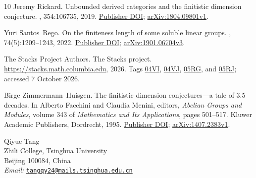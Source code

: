 \documentclass[11pt]{article}
\numberwithin{equation}{section}
\theoremstyle{definition}
\theoremstyle{remark}
\begin{document}
\begin{thebibliography}{10}
Jeremy Rickard.
\newblock Unbounded derived categories and the finitistic dimension conjecture.
, 354:106735, 2019.
\newblock \href{https://doi.org/10.1016/j.aim.2019.106735}{Publisher DOI};
  \href{https://arxiv.org/abs/1804.09801v1}{arXiv:1804.09801v1}.

Yuri Santos~Rego.
\newblock On the finiteness length of some soluble linear groups.
, 74(5):1209--1243, 2022.
\newblock \href{https://doi.org/10.4153/S0008414X21000213}{Publisher DOI};
  \href{https://arxiv.org/abs/1901.06704v3}{arXiv:1901.06704v3}.

{The Stacks Project Authors}.
\newblock The {Stacks} project.
\newblock \url{https://stacks.math.columbia.edu}, 2026.
\newblock Tags \href{https://stacks.math.columbia.edu/tag/04VI}{04VI},
  \href{https://stacks.math.columbia.edu/tag/04VJ}{04VJ},
  \href{https://stacks.math.columbia.edu/tag/05RG}{05RG}, and
  \href{https://stacks.math.columbia.edu/tag/05RJ}{05RJ}; accessed 7 October 2026.

Birge Zimmermann~Huisgen.
\newblock The finitistic dimension conjectures---a tale of 3.5 decades.
\newblock In Alberto Facchini and Claudia Menini, editors, {\em Abelian Groups
  and Modules}, volume 343 of {\em Mathematics and Its Applications}, pages
  501--517. Kluwer Academic Publishers, Dordrecht, 1995.
\newblock \href{https://doi.org/10.1007/978-94-011-0443-2_41}{Publisher DOI};
  \href{https://arxiv.org/abs/1407.2383v1}{arXiv:1407.2383v1}.

\end{thebibliography}

\bigskip
\noindent Qiyue Tang\\
Zhili College, Tsinghua University\\
Beijing 100084, China\\
\textit{Email:} \href{mailto:tangqy24@mails.tsinghua.edu.cn}{\texttt{tangqy24@mails.tsinghua.edu.cn}}
\end{document}

